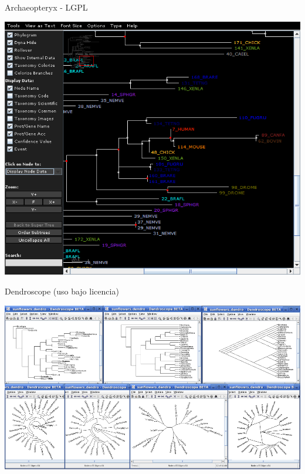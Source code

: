 \documentclass[green, compress]{beamer}
\begin{document}
\begin{frame}{Archaeopteryx - LGPL}
\begin{center}
\includegraphics[scale=.3]{bcl2.png}
\end{center}
\end{frame}

\begin{frame}{Dendroscope (uso bajo licencia)}
\begin{center}
\includegraphics[scale=.3]{7views.png}
\end{center}
\end{frame}
\end{document}
